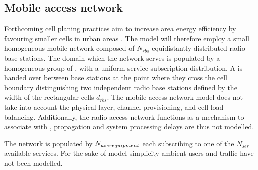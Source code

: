 \subsection{Mobile access network}
Forthcoming cell planing practices aim to increase area energy efficiency by favouring smaller cells in urban areas \cite{shahab2013framework,5360741}. The model will therefore employ a small homogeneous mobile network composed of $N_{rbs}$ equidistantly distributed radio base stations. The domain which the network serves is populated by a homogeneous group of \ues{}, with a uniform service subscription distribution. A \ue{} is handed over between base stations at the point where they cross the cell boundary distinguishing two independent radio base stations defined by the width of the rectangular cells $d_{rbs}$. The mobile access network model does not take into account the physical layer, channel provisioning, and cell load balancing. Additionally, the radio access network functions as a mechanism to associate \ues{} with \dcs{}, propagation and system processing delays are thus not modelled.

The network is populated by $N_{user equipment}$ each subscribing to one of the $N_{ser}$ available services. For the sake of model simplicity ambient users and traffic have not been modelled.